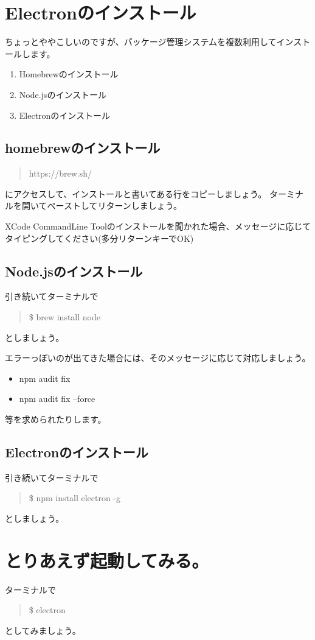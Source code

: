 \documentclass[mingoth,11pt,a4j,uplatex]{jsarticle}
\begin{document}
\section{Electronのインストール}
ちょっとややこしいのですが、パッケージ管理システムを複数利用してインストールします。

\begin{enumerate}
\item Homebrewのインストール
\item Node.jsのインストール
\item Electronのインストール
\end{enumerate}

\subsection{homebrewのインストール}
\begin{quote}
https://brew.sh/
\end{quote}
にアクセスして、インストールと書いてある行をコピーしましょう。
ターミナルを開いてペーストしてリターンしましょう。

XCode CommandLine Toolのインストールを聞かれた場合、メッセージに応じてタイピングしてください(多分リターンキーでOK)




\subsection{Node.jsのインストール}
引き続いてターミナルで
\begin{quote}
\$ brew install node
\end{quote}
としましょう。

エラーっぽいのが出てきた場合には、そのメッセージに応じて対応しましょう。

\begin{itemize}
\item npm audit fix
\item npm audit fix --force
\end{itemize}
等を求められたりします。

\subsection{Electronのインストール}
引き続いてターミナルで
\begin{quote}
\$ npm install electron -g
\end{quote}
としましょう。


\section{とりあえず起動してみる。}
ターミナルで
\begin{quote}
\$ electron
\end{quote}
としてみましょう。
\end{document}
